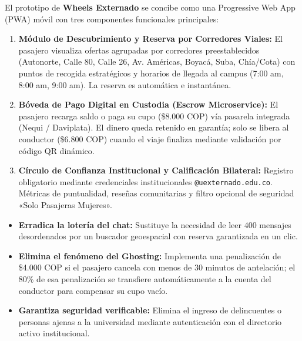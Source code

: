 \documentclass[11pt,a4paper]{article}
\begin{document}
El prototipo de \textbf{Wheels Externado} se concibe como una Progressive Web App (PWA) móvil con tres componentes funcionales principales:

\begin{enumerate}[leftmargin=*]
    \item \textbf{Módulo de Descubrimiento y Reserva por Corredores Viales:} El pasajero visualiza ofertas agrupadas por corredores preestablecidos (Autonorte, Calle 80, Calle 26, Av. Américas, Boyacá, Suba, Chía/Cota) con puntos de recogida estratégicos y horarios de llegada al campus (7:00 am, 8:00 am, 9:00 am). La reserva es automática e instantánea.
    \item \textbf{Bóveda de Pago Digital en Custodia (Escrow Microservice):} El pasajero recarga saldo o paga su cupo (\$8.000 COP) vía pasarela integrada (Nequi / Daviplata). El dinero queda retenido en garantía; solo se libera al conductor (\$6.800 COP) cuando el viaje finaliza mediante validación por código QR dinámico.
    \item \textbf{Círculo de Confianza Institucional y Calificación Bilateral:} Registro obligatorio mediante credenciales institucionales \texttt{@uexternado.edu.co}. Métricas de puntualidad, reseñas comunitarias y filtro opcional de seguridad «Solo Pasajeras Mujeres».
\end{enumerate}

\begin{tcolorbox}[colback=white,colframe=primary,title=\textbf{¿Por qué este prototipo resuelve efectivamente el problema de los clientes?}]
\begin{itemize}[leftmargin=*]
    \item \textbf{Erradica la lotería del chat:} Sustituye la necesidad de leer 400 mensajes desordenados por un buscador geoespacial con reserva garantizada en un clic.
    \item \textbf{Elimina el fenómeno del Ghosting:} Implementa una penalización de \$4.000 COP si el pasajero cancela con menos de 30 minutos de antelación; el 80\% de esa penalización se transfiere automáticamente a la cuenta del conductor para compensar su cupo vacío.
    \item \textbf{Garantiza seguridad verificable:} Elimina el ingreso de delincuentes o personas ajenas a la universidad mediante autenticación con el directorio activo institucional.
\end{itemize}
\end{tcolorbox}

\end{document}

